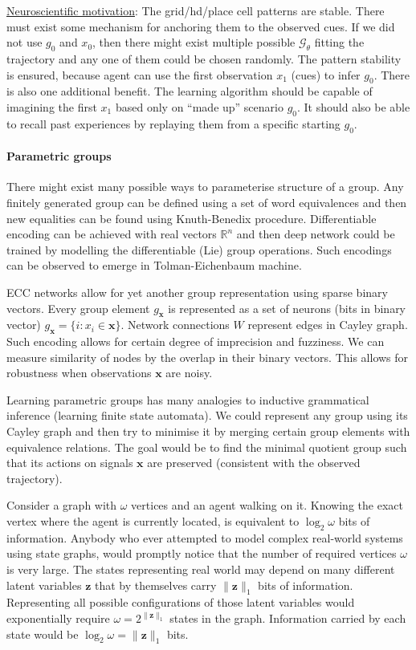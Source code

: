 \documentclass[12pt]{article}
\begin{document}
\underline{Neuroscientific motivation}: The grid/hd/place cell patterns are stable. There must exist some mechanism for anchoring them to the observed cues. If we did not use $g_0$ and $x_0$, then there might exist multiple possible $\mathcal{G}_\theta$ fitting the trajectory and any one of them could be chosen randomly. The pattern stability is ensured, because agent can use the first observation $x_1$ (cues) to infer $g_0$.
There is also one additional benefit. The learning algorithm should be capable of imagining the first $x_1$ based only on ``made up'' scenario $g_0$. It should also be able to recall past experiences by replaying them from a specific starting $g_0$.

\paragraph{Parametric groups}

There might exist many possible ways to parameterise structure of a group. Any finitely generated group can be defined using a set of word equivalences and then new equalities can be found using Knuth-Benedix procedure. Differentiable encoding can be achieved with real vectors $\mathbb{R}^n$ and then deep network could be trained by modelling the differentiable (Lie) group operations. Such encodings can be observed to emerge in Tolman-Eichenbaum machine. 

ECC networks allow for yet another group representation using sparse binary vectors. 
Every group element $g_{\boldsymbol{x}}$ is represented as a set of neurons (bits in binary vector) $g_{\boldsymbol{x}}=\{i:x_i\in\boldsymbol{x}\}$. Network connections  $W$ represent edges in Cayley graph. Such encoding allows for certain degree of imprecision and fuzziness. We can measure similarity of nodes by the overlap in their binary vectors. This allows for robustness when observations $\boldsymbol{x}$ are noisy.


Learning parametric groups has many analogies to inductive grammatical inference (learning finite state automata). We could represent any group using its Cayley graph and then try to minimise it by merging certain group elements with equivalence relations. The goal would be to find the minimal quotient group such that its actions on signals $\boldsymbol{x}$ are preserved (consistent with the observed trajectory). 

Consider a graph with $\omega$ vertices and an agent walking on it. Knowing the exact vertex where the agent is currently located, is equivalent to $\log_2 \omega$ bits of information. Anybody who ever attempted to model complex real-world systems using state graphs, would promptly notice that the number of required vertices $\omega$ is very large. The states representing real world may depend on many different latent variables $\boldsymbol{z}$ that by themselves carry $\lVert \boldsymbol{z} \rVert_1$ bits of information. Representing all possible configurations of those latent variables would exponentially require $\omega=2^{\lVert \boldsymbol{z} \rVert_1}$ states in the graph. Information carried by each state would be $\log_2 \omega=\lVert \boldsymbol{z} \rVert_1$ bits.
\end{document}
